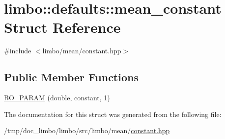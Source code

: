 \hypertarget{structlimbo_1_1defaults_1_1mean__constant}{}\section{limbo\+:\+:defaults\+:\+:mean\+\_\+constant Struct Reference}
\label{structlimbo_1_1defaults_1_1mean__constant}


{\ttfamily \#include $<$limbo/mean/constant.\+hpp$>$}

\subsection*{Public Member Functions}
\begin{DoxyCompactItemize}
\item 
\hyperlink{group__mean__defaults_gafa1b143b975c61c4547a005794f44a12}{B\+O\+\_\+\+P\+A\+R\+A\+M} (double, constant, 1)
\end{DoxyCompactItemize}


The documentation for this struct was generated from the following file\+:\begin{DoxyCompactItemize}
\item 
/tmp/doc\+\_\+limbo/limbo/src/limbo/mean/\hyperlink{constant_8hpp}{constant.\+hpp}\end{DoxyCompactItemize}

